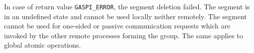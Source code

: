 \documentclass[a4paper]{article}
\newlength{\st}\setlength{\st}{0pt}
\newcommand{\zsep}[1]{#1}
\newcommand{\gaspiprefix}{gaspi}
\newcommand{\GASPI}{{\sc Gaspi}}
\newcommand{\function}[1]{{\tt #1}}
\newcommand{\parameter}[1]{{\it #1}}
\newcommand{\gaspifunction}[1]{\function{\protect\zsep{\gaspiprefix\_#1}}}
\newcommand{\finalsymb}[1]{\leavevmode\unskip\penalty9999\hbox{}\nobreak\hfill\hskip 1em minus 0.5em\hbox{#1}}
\newenvironment{cbox}[1]
{\newcommand\colboxcolor{#1}\begin{lrbox}{\riddlebox}\begin{minipage}{\dimexpr\columnwidth-2\fboxsep\relax}}
{\end{minipage}\end{lrbox}\begin{center}\colorbox[HTML]{\colboxcolor}{\usebox{\riddlebox}}\end{center}}
\newcommand{\shortlistbegin}[1]{\begin{trivlist}\setlength{\itemsep}{0pt}\item[]\emph{#1:}}
\newcommand{\shortlistitem}[1]{\item[]#1}
\newcommand{\shortlistend}{\end{trivlist}}
\newenvironment{FDef}{\begin{trivlist}\item[]}{\end{trivlist}}
\newenvironment{FDefSign}{\begin{cbox}{EEEEEE}}{\end{cbox}}
\newcommand{\parameterlistbegin}{\shortlistbegin{Parameter}}
\newcommand{\parameterlistend}{\shortlistend}
\newcommand{\parameterlistitem}[3]{\shortlistitem{\parameter{(#1) #2:} {#3}}}
\newcommand{\executionphase}[1]{\shortlistbegin{Execution phase}\shortlistitem{#1}\shortlistend}
\newcommand{\executionphasework}{\executionphase{Working}}
\newcommand{\returnlistbegin}{\shortlistbegin{Return values}}
\newcommand{\returnlistend}{\shortlistend}
\newcommand{\returnlistitem}[2]{\item[]#1: #2}
\newcommand{\fdeffinal}{\finalsymb{$\lrcorner$}}
\newcommand{\GASPISUCC}{{\tt\protect\zsep{GASPI\_SUCCESS}}}
\newcommand{\GASPISUCCTXT}{operation has returned successfully}
\newcommand{\GASPITIME}{{\tt\protect\zsep{GASPI\_TIMEOUT}}}
\newcommand{\GASPITIMETXT}{operation has run into a timeout}
\newcommand{\GASPIGERR}{{\tt\protect\zsep{GASPI\_ERROR}}}
\newcommand{\GASPIGERRTXT}{operation has finished with an error}
\newcommand{\FStdRetDesc}
{
  \returnlistbegin
  \returnlistitem{\GASPISUCC}{\GASPISUCCTXT}
  \returnlistitem{\GASPITIME}{\GASPITIMETXT}
  \returnlistitem{\GASPIGERR}{\GASPIGERRTXT}
  \fdeffinal\returnlistend
}
\newcommand{\gaspisemantic}[1]{{\emph{#1}}}
\begin{document}
In case of return value \GASPIGERR{}, the segment deletion failed. The
segment is in an undefined state and cannot be used locally neither
remotely. The segment cannot be used for one-sided or passive
communication requests which are invoked by the other remote processes
forming the group. The same applies to global atomic operations.

%
%
%
%
%
%
\end{document}
